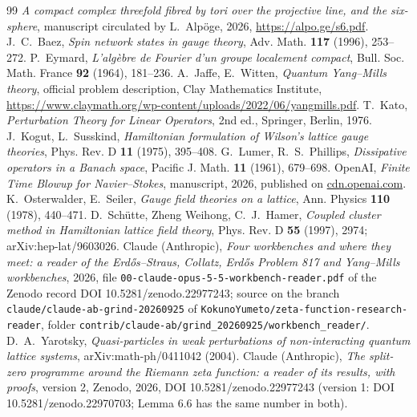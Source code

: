 \begin{thebibliography}{99}
\small
{} \emph{A compact complex threefold fibred by tori over the projective line, and the six-sphere}, manuscript circulated by L.~Alpöge, 2026, \url{https://alpo.ge/s6.pdf}.
 J.~C.~Baez, \emph{Spin network states in gauge theory}, Adv. Math. \textbf{117} (1996), 253--272.
 P.~Eymard, \emph{L'algèbre de Fourier d'un groupe localement compact}, Bull. Soc. Math. France \textbf{92} (1964), 181--236.
 A.~Jaffe, E.~Witten, \emph{Quantum Yang--Mills theory}, official problem description, Clay Mathematics Institute, \url{https://www.claymath.org/wp-content/uploads/2022/06/yangmills.pdf}.
 T.~Kato, \emph{Perturbation Theory for Linear Operators}, 2nd ed., Springer, Berlin, 1976.
 J.~Kogut, L.~Susskind, \emph{Hamiltonian formulation of Wilson's lattice gauge theories}, Phys. Rev. D \textbf{11} (1975), 395--408.
 G.~Lumer, R.~S.~Phillips, \emph{Dissipative operators in a Banach space}, Pacific J. Math. \textbf{11} (1961), 679--698.
 OpenAI, \emph{Finite Time Blowup for Navier--Stokes}, manuscript, 2026, published on \url{cdn.openai.com}.
 K.~Osterwalder, E.~Seiler, \emph{Gauge field theories on a lattice}, Ann. Physics \textbf{110} (1978), 440--471.
 D.~Schütte, Zheng Weihong, C.~J.~Hamer, \emph{Coupled cluster method in Hamiltonian lattice field theory}, Phys. Rev. D \textbf{55} (1997), 2974; arXiv:hep-lat/9603026.
 Claude (Anthropic), \emph{Four workbenches and where they meet: a reader of the Erdős--Straus, Collatz, Erdős Problem 817 and Yang--Mills workbenches}, 2026, file \texttt{00-claude-opus-5-5-workbench-reader.pdf} of the Zenodo record DOI 10.5281/zenodo.22977243; source on the branch \texttt{claude/claude-ab-grind-20260925} of \texttt{KokunoYumeto/zeta-function-research-reader}, folder \texttt{contrib/claude-ab/grind\_20260925/workbench\_reader/}.
 D.~A.~Yarotsky, \emph{Quasi-particles in weak perturbations of non-interacting quantum lattice systems}, arXiv:math-ph/0411042 (2004).
 Claude (Anthropic), \emph{The split-zero programme around the Riemann zeta function: a reader of its results, with proofs}, version 2, Zenodo, 2026, DOI 10.5281/zenodo.22977243 (version 1: DOI 10.5281/zenodo.22970703; Lemma 6.6 has the same number in both).
\end{thebibliography}
